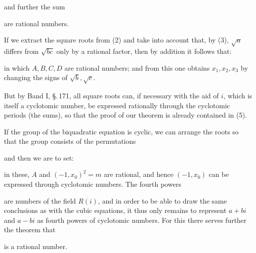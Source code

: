 and further the sum


are rational numbers.

If we extract the square roots from (2) and take into account that, by (3),
$\sqrt{a}$ differs from $\sqrt{bc}$ only by a rational factor, then by
addition it follows that:


in which $A, B, C, D$ are rational numbers; and from this one obtains $x_1,
x_2, x_3$ by changing the signs of $\sqrt{b}, \sqrt{c}$.

But by Band I, \S.\,171, all square roots can, if necessary with the aid of
$i$, which is itself a cyclotomic number, be expressed rationally through
the cyclotomic periods (the  sums), so that the proof of
our theorem is already contained in (5).

\noindent\hrulefill

If the group of the biquadratic equation is cyclic, we can arrange the
roots so that the group consists of the permutations


and then we are to set:


in these, $A$ and $(-1,x_0)^2=m$ are rational, and hence $(-1,x_0)$ can be
expressed through cyclotomic numbers. The fourth powers


are numbers of the field $R(i)$, and in order to be able to draw the same
conclusions as with the cubic equations, it thus only remains to represent
$a+bi$ and $a-bi$ as fourth powers of cyclotomic numbers. For this there
serves further the theorem that


is a rational number.
